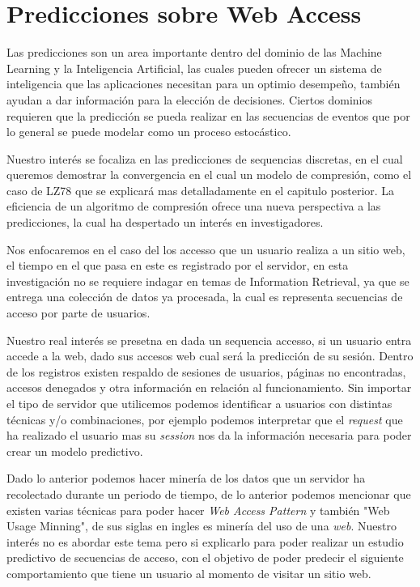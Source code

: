 \chapter[Predicciones sobre Web Access]{Predicciones sobre Web Access}
\label{ch:tema}





Las predicciones son un area importante dentro del dominio de las Machine Learning y la Inteligencia Artificial, las cuales pueden ofrecer un sistema de inteligencia que las aplicaciones necesitan para un optimio desempeño, también ayudan a dar información para la elección de decisiones. Ciertos dominios requieren que la predicción se pueda realizar en las secuencias de eventos que por lo general se puede modelar como un proceso estocástico. 

Nuestro interés se focaliza en las predicciones de sequencias discretas, en el cual queremos demostrar la convergencia en el cual un modelo de compresión, como el caso de LZ78 que se explicará mas detalladamente en el capitulo posterior. La eficiencia de un algoritmo de compresión ofrece una nueva perspectiva a las predicciones, la cual ha despertado un interés en investigadores.

Nos enfocaremos en el caso del los accesso que un usuario realiza a un sitio web, el tiempo en el que pasa en este es registrado por el servidor, en esta investigación no se requiere indagar en temas de Information Retrieval, ya que se entrega una colección de datos ya procesada, la cual es representa secuencias de acceso por parte de usuarios.




Nuestro real interés se presetna en dada un sequencia accesso, si un usuario entra accede a la web, dado sus accesos web cual será la predicción de su sesión.  Dentro de los registros existen respaldo de sesiones de usuarios, páginas no encontradas, accesos denegados y otra información en relación al funcionamiento. Sin importar el tipo de servidor que utilicemos podemos identificar a usuarios con distintas técnicas y/o combinaciones, por ejemplo podemos interpretar que el \emph{request} que ha realizado el usuario mas su \emph{session} nos da la información necesaria para poder crear un modelo predictivo.

Dado lo anterior podemos hacer minería de los datos que un servidor ha recolectado durante un periodo de tiempo, de lo anterior  podemos mencionar que existen varias técnicas para poder hacer \emph{Web Access Pattern } y también  "Web Usage Minning", de sus siglas en ingles es minería del uso de una \emph{web}. Nuestro interés no es abordar este tema pero si explicarlo para poder realizar un estudio predictivo de secuencias de acceso, con el objetivo de poder predecir el siguiente comportamiento que tiene un usuario al momento de visitar un sitio web.


